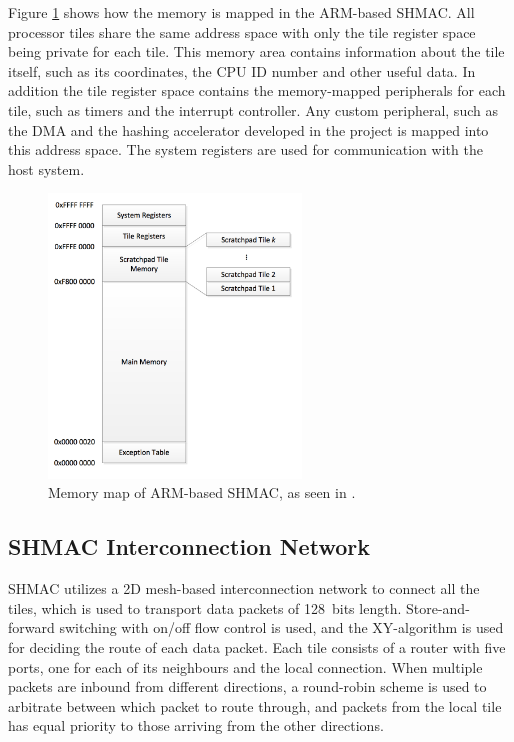 Figure \ref{fig:shmac-memory} shows how the memory is mapped in the ARM-based SHMAC. All
processor tiles share the same address space with only the tile register space being
private for each tile. This memory area contains information about the tile itself, such as its coordinates,
the CPU ID number and other useful data. In addition the tile register space contains the memory-mapped
peripherals for each tile, such as timers and the interrupt controller.
Any custom peripheral, such as the DMA and the hashing accelerator developed in the project is mapped into this address space.
The system registers are used for communication with the host system.

\begin{figure}[htb]
    \centering
    \includegraphics[width=0.6\textwidth]{Figures/Heterogeneous/SHMACMemory}
    \caption{Memory map of ARM-based SHMAC, as seen in \cite{shmac-plan}.}
    \label{fig:shmac-memory}
\end{figure}

\subsection{SHMAC Interconnection Network}

SHMAC utilizes a 2D mesh-based interconnection network to connect all the tiles, which is used to transport data packets of 128~bits length.
Store-and-forward switching with on/off flow control is used, and the XY-algorithm is used for deciding the route of each data packet.
Each tile consists of a router with five ports, one for each of its neighbours and the local connection.
When multiple packets are inbound from different directions, a round-robin scheme is used to arbitrate between which
packet to route through, and packets from the local tile has equal priority to those arriving from the other directions. \cite{shmac-plan}

